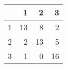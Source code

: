 \begin{tabular}{rrrr}
  \hline
 & 1 & 2 & 3 \\ 
  \hline
1 &  13 &   8 &   2 \\ 
  2 &   2 &  13 &   5 \\ 
  3 &   1 &   0 &  16 \\ 
   \hline
\end{tabular}
